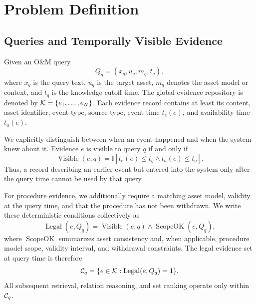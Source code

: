 \section{Problem Definition}
\label{sec:problem}

\subsection{Queries and Temporally Visible Evidence}

Given an O\&M query
\begin{equation}
Q_q=(x_q,u_q,m_q,t_q),
\end{equation}
where $x_q$ is the query text, $u_q$ is the target asset, $m_q$ denotes the asset model or context, and $t_q$ is the knowledge cutoff time. The global evidence repository is denoted by $\mathcal{K}=\{e_1,\ldots,e_N\}$. Each evidence record contains at least its content, asset identifier, event type, source type, event time $t_e(e)$, and availability time $t_a(e)$.

We explicitly distinguish between when an event happened and when the system knew about it. Evidence $e$ is visible to query $q$ if and only if
\begin{equation}
\operatorname{Visible}(e,q)
=
\mathbb{I}\!\left[
t_e(e)\le t_q \land t_a(e)\le t_q
\right].
\label{eq:visible}
\end{equation}
Thus, a record describing an earlier event but entered into the system only after the query time cannot be used by that query.

For procedure evidence, we additionally require a matching asset model, validity at the query time, and that the procedure has not been withdrawn. We write these deterministic conditions collectively as
\begin{equation}
\operatorname{Legal}(e,Q_q)
=
\operatorname{Visible}(e,q)
\land
\operatorname{ScopeOK}(e,Q_q),
\label{eq:legal}
\end{equation}
where $\operatorname{ScopeOK}$ summarizes asset consistency and, when applicable, procedure model scope, validity interval, and withdrawal constraints. The legal evidence set at query time is therefore
\begin{equation}
\mathcal{C}_q
=
\{e\in\mathcal{K}:\operatorname{Legal}(e,Q_q)=1\}.
\label{eq:candidate}
\end{equation}
All subsequent retrieval, relation reasoning, and set ranking operate only within $\mathcal{C}_q$.

